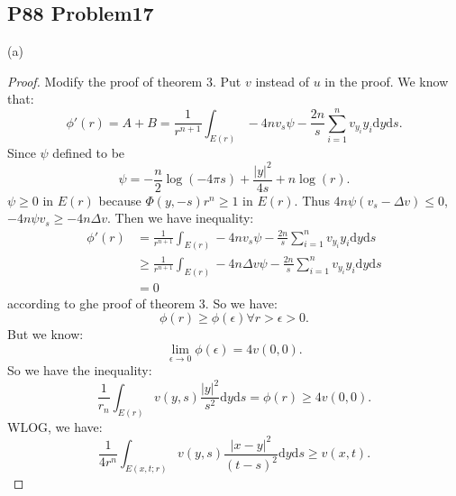 \documentclass[a4paper]{ctexart}
\newcommand{\dif}{\mathrm{d}}
\begin{document}
\subsection*{P88 Problem17}
(a)
\begin{proof}
    Modify the proof of theorem 3. Put $v$ instead of $u$ in the proof. We know that:
    \begin{equation}
        \phi'(r)=A+B=\frac{1}{r^{n+1}}\int_{E(r)}-4nv_{s}\psi-\frac{2n}{s}\sum_{i=1}^{n}v_{y_{i}}y_{i}\dif y\dif s.
    \end{equation}
    Since $\psi$ defined to be 
    \begin{equation}
        \psi=-\frac{n}{2}\log(-4\pi s)+\frac{|y|^{2}}{4s}+n\log(r).
    \end{equation}
    $\psi\ge 0$  in $E(r)$ because $\Phi(y,-s)r^{n}\ge1$ in $E(r)$. Thus $4n\psi(v_{s}-\Delta v)\leqslant 0$, $-4n\psi v_{s}\ge-4n\Delta v$. Then we have inequality:
    \begin{equation}
        \begin{aligned}
            \phi'(r)&=\frac{1}{r^{n+1}}\int_{E(r)}-4nv_{s}\psi-\frac{2n}{s}\sum_{i=1}^{n}v_{y_{i}}y_{i}\dif y\dif s\\
            &\ge\frac{1}{r^{n+1}}\int_{E(r)}-4n\Delta v\psi-\frac{2n}{s}\sum_{i=1}^{n}v_{y_{i}}y_{i}\dif y\dif s\\
            &=0
        \end{aligned}
    \end{equation}
    according to ghe proof of theorem 3. So we have:
    \begin{equation}
        \phi(r)\ge\phi(\epsilon)\forall r>\epsilon>0.
    \end{equation}
    But we know:
    \begin{equation}
        \lim_{\epsilon\rightarrow 0}\phi(\epsilon)=4v(0,0).
    \end{equation}
    So we have the inequality:
    \begin{equation}
        \frac{1}{r_{n}}\int_{E(r)}v(y,s)\frac{|y|^{2}}{s^{2}}\dif y\dif s=\phi(r)\ge 4v(0,0).
    \end{equation}
    WLOG, we have:
    \begin{equation}
        \frac{1}{4r^{n}}\int_{E(x,t;r)}v(y,s)\frac{|x-y|^{2}}{(t-s)^{2}}\dif y\dif s\ge v(x,t).
    \end{equation}
\end{proof}
\end{document}
